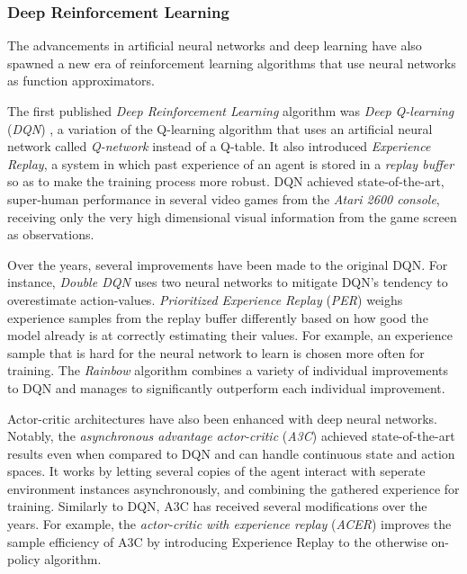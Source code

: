 \subsubsection{Deep Reinforcement Learning}
The advancements in artificial neural networks and deep learning have also spawned a new era of reinforcement learning algorithms that use neural networks as function approximators.

The first published \textit{Deep Reinforcement Learning} algorithm was \textit{Deep Q-learning} (\textit{DQN}) \cite{dqn}, a variation of the Q-learning algorithm that uses an artificial neural network called \textit{Q-network} instead of a Q-table. It also introduced \textit{Experience Replay}, a system in which past experience of an agent is stored in a \textit{replay buffer} so as to make the training process more robust. DQN achieved state-of-the-art, super-human performance in several video games from the \textit{Atari 2600 console}, receiving only the very high dimensional visual information from the game screen as observations.

Over the years, several improvements have been made to the original DQN. For instance, \textit{Double DQN} \cite{double-dqn} uses two neural networks to mitigate DQN's tendency to overestimate action-values. \textit{Prioritized Experience Replay} (\textit{PER}) \cite{per} weighs experience samples from the replay buffer differently based on how good the model already is at correctly estimating their values. For example, an experience sample that is hard for the neural network to learn is chosen more often for training. The \textit{Rainbow} algorithm \cite{rainbow} combines a variety of individual improvements to DQN and manages to significantly outperform each individual improvement.

Actor-critic architectures have also been enhanced with deep neural networks. Notably, the \textit{asynchronous advantage actor-critic} (\textit{A3C}) \cite{a3c} achieved state-of-the-art results even when compared to DQN and can handle continuous state and action spaces. It works by letting several copies of the agent interact with seperate environment instances asynchronously, and combining the gathered experience for training. Similarly to DQN, A3C has received several modifications over the years. For example, the \textit{actor-critic with experience replay} (\textit{ACER}) \cite{acer} improves the sample efficiency of A3C by introducing Experience Replay to the otherwise on-policy algorithm.

